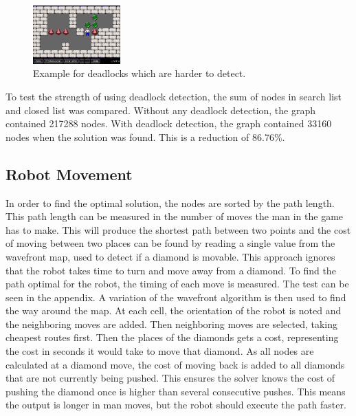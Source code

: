 \begin{figure}[h]
  \centering
  \includegraphics[width=0.3\textwidth]{img/deadlock_hard}
  \caption{Example for deadlocks which are harder to detect.}
  \label{fig:deadlock_hard}
\end{figure}

To test the strength of using deadlock detection, the sum of nodes in search list and closed list was compared.
Without any deadlock detection, the graph contained 217288 nodes.
With deadlock detection, the graph contained 33160 nodes when the solution was found.
This is a reduction of 86.76\%. 

\subsection{Robot Movement}
In order to find the optimal solution, the nodes are sorted by the path length.
This path length can be measured in the number of moves the man in the game has to make.
This will produce the shortest path between two points and the cost of moving between two places can be found by reading a single value from the wavefront map, used to detect if a diamond is movable.
This approach ignores that the robot takes time to turn and move away from a diamond.
To find the path optimal for the robot, the timing of each move is measured.
The test can be seen in the appendix.
A variation of the wavefront algorithm is then used to find the way around the map.
At each cell, the orientation of the robot is noted and the neighboring moves are added.
Then neighboring moves are selected, taking cheapest routes first.
Then the places of the diamonds gets a cost, representing the cost in seconds it would take to move that diamond.
As all nodes are calculated at a diamond move, the cost of moving back is added to all diamonds that are not currently being pushed.
This ensures the solver knows the cost of pushing the diamond once is higher than several consecutive pushes. 
This means the output is longer in man moves, but the robot should execute the path faster.

